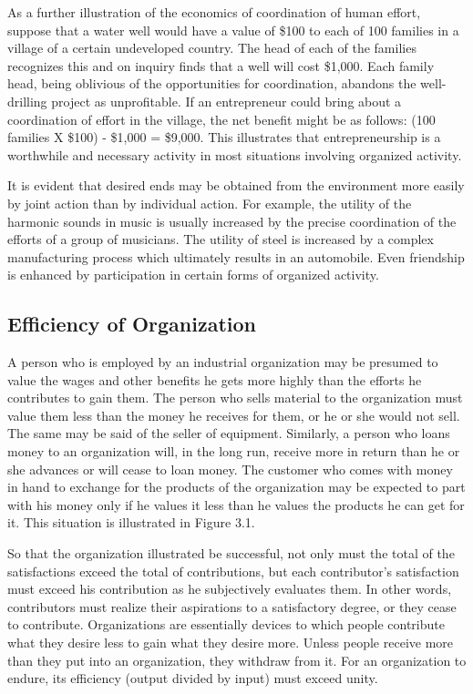 As a further illustration of the economics of coordination of human effort, suppose that a water well would have a value of \$100 to each of 100 families in a village of a certain undeveloped country. The head of each of the families recognizes this and on inquiry finds that a well will cost \$1,000. Each family head, being oblivious of the opportunities for coordination, abandons the well-drilling project as unprofitable. If an entrepreneur could bring about a coordination of effort in the village, the net benefit might be as follows: (100 families X \$100) - \$1,000 = \$9,000. This illustrates that entrepreneurship is a worthwhile and necessary activity in most situations involving organized activity.

It is evident that desired ends may be obtained from the environment more easily by joint action than by individual action. For example, the utility of the harmonic sounds in music is usually increased by the precise coordination of the efforts of a group of musicians. The utility of steel is increased by a complex manufacturing process which ultimately results in an automobile. Even friendship is enhanced by participation in certain forms of organized activity.

\subsection{Efficiency of Organization}

A person who is employed by an industrial organization may be presumed to value the wages and other benefits he gets more highly than the efforts he contributes to gain them. The person who sells material to the organization must value them less than the money he receives for them, or he or she would not sell. The same may be said of the seller of equipment. Similarly, a person who loans money to an organization will, in the long run, receive more in return than he or she advances or will cease to loan money. The customer who comes with money in hand to exchange for the products of the organization may be expected to part with his money only if he values it less than he values the products he can get for it. This situation is illustrated in Figure 3.1.

So that the organization illustrated be successful, not only must the total of the satisfactions exceed the total of contributions, but each contributor’s satisfaction must exceed his contribution as he subjectively evaluates them. In other words, contributors must realize their aspirations to a satisfactory degree, or they cease to contribute. Organizations are essentially devices to which people contribute what they desire less to gain what they desire more. Unless people receive more than they put into an organization, they withdraw from it. For an organization to endure, its efficiency (output divided by input) must exceed unity.

